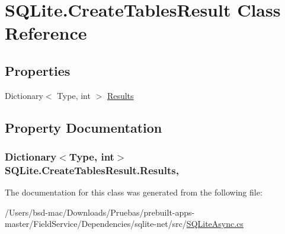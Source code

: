 \hypertarget{class_s_q_lite_1_1_create_tables_result}{\section{S\+Q\+Lite.\+Create\+Tables\+Result Class Reference}
\label{class_s_q_lite_1_1_create_tables_result}
}
\subsection*{Properties}
\begin{DoxyCompactItemize}
\item 
Dictionary$<$ Type, int $>$ \hyperlink{class_s_q_lite_1_1_create_tables_result_a570a918ea3d12d83f8dd1e2116c818c5}{Results}
\end{DoxyCompactItemize}


\subsection{Property Documentation}
\hypertarget{class_s_q_lite_1_1_create_tables_result_a570a918ea3d12d83f8dd1e2116c818c5}{
\subsubsection[{Results}]{\setlength{\rightskip}{0pt plus 5cm}Dictionary$<$Type, int$>$ S\+Q\+Lite.\+Create\+Tables\+Result.\+Results\hspace{0.3cm}{\ttfamily [get]}, {\ttfamily [set]}}}\label{class_s_q_lite_1_1_create_tables_result_a570a918ea3d12d83f8dd1e2116c818c5}


The documentation for this class was generated from the following file\+:\begin{DoxyCompactItemize}
\item 
/\+Users/bsd-\/mac/\+Downloads/\+Pruebas/prebuilt-\/apps-\/master/\+Field\+Service/\+Dependencies/sqlite-\/net/src/\hyperlink{_s_q_lite_async_8cs}{S\+Q\+Lite\+Async.\+cs}\end{DoxyCompactItemize}
